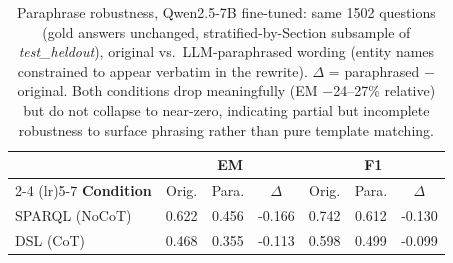 \begin{table}[t]
\centering
\small
\begin{tabular}{l ccc ccc}
\toprule
 & \multicolumn{3}{c}{\textbf{EM}} & \multicolumn{3}{c}{\textbf{F1}} \\
\cmidrule(lr){2-4} \cmidrule(lr){5-7}
\textbf{Condition} & Orig. & Para. & $\Delta$ & Orig. & Para. & $\Delta$ \\
\midrule
SPARQL (NoCoT) & 0.622 & 0.456 & -0.166 & 0.742 & 0.612 & -0.130 \\
DSL (CoT) & 0.468 & 0.355 & -0.113 & 0.598 & 0.499 & -0.099 \\
\bottomrule
\end{tabular}
\caption{Paraphrase robustness, Qwen2.5-7B fine-tuned: same 1502 questions (gold answers unchanged, stratified-by-Section subsample of \emph{test\_heldout}), original vs.\ LLM-paraphrased wording (entity names constrained to appear verbatim in the rewrite). $\Delta$ = paraphrased $-$ original. Both conditions drop meaningfully (EM $-$24--27\% relative) but do not collapse to near-zero, indicating partial but incomplete robustness to surface phrasing rather than pure template matching.}
\label{tab:paraphrase-robustness}
\end{table}

